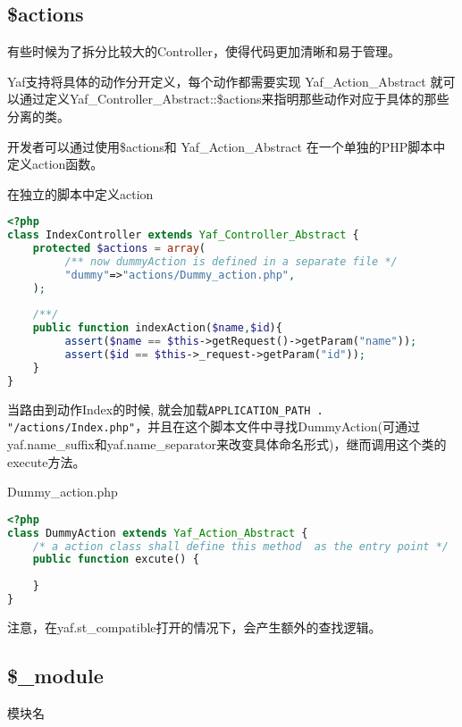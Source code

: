\subsection{\$actions}


有些时候为了拆分比较大的Controller，使得代码更加清晰和易于管理。

Yaf支持将具体的动作分开定义，每个动作都需要实现 Yaf\_Action\_Abstract 就可以通过定义Yaf\_Controller\_Abstract::\$actions来指明那些动作对应于具体的那些分离的类。




开发者可以通过使用\$actions和 Yaf\_Action\_Abstract 在一个单独的PHP脚本中定义action函数。



\begin{example}
在独立的脚本中定义action
\begin{lstlisting}[language=PHP]
<?php
class IndexController extends Yaf_Controller_Abstract {
    protected $actions = array(
         /** now dummyAction is defined in a separate file */
         "dummy"=>"actions/Dummy_action.php",
    );
    
    /**/
    public function indexAction($name,$id){
         assert($name == $this->getRequest()->getParam("name"));
         assert($id == $this->_request->getParam("id"));
    }
}
\end{lstlisting}
\end{example}


当路由到动作Index的时候, 就会加载\texttt{APPLICATION\_PATH . "/actions/Index.php"}，并且在这个脚本文件中寻找DummyAction(可通过yaf.name\_suffix和yaf.name\_separator来改变具体命名形式)，继而调用这个类的execute方法。

\begin{example}
Dummy\_action.php
\begin{lstlisting}[language=PHP]
<?php
class DummyAction extends Yaf_Action_Abstract {
    /* a action class shall define this method  as the entry point */
    public function excute() {
    
    }
}
\end{lstlisting}
\end{example}

注意，在yaf.st\_compatible打开的情况下，会产生额外的查找逻辑。


\subsection{\$\_module}

模块名

